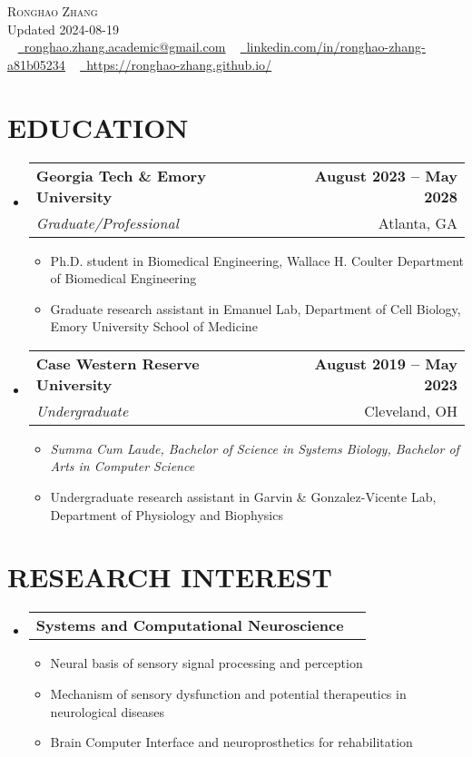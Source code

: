 \documentclass[letterpaper,11pt]{article}
\makeatletter
\newcommand{\resumeItem}[1]{
	\item\small{
		{#1 \vspace{0pt}}
	}
}
\newcommand{\resumeSubheading}[4]{
	\vspace{-2pt}\item
	\begin{tabular*}{1.0\textwidth}[t]{l@{\extracolsep{\fill}}r}
		\textbf{#1} & \textbf{\small #2} \\
		\textit{\small#3} & {\small #4} \\
	\end{tabular*}\vspace{-4pt}
}
\newcommand{\resumeResearchHeading}[2]{
	\vspace{-2pt}\item
	\begin{tabular*}{1.0\textwidth}[t]{l@{\extracolsep{\fill}}r}
		\textbf{#1} & \textbf{\small #2} \\
	\end{tabular*}\vspace{-4pt}
}
\newcommand{\resumeSubHeadingListStart}{\begin{itemize}[leftmargin=0.0in, label={}]}
\newcommand{\resumeSubHeadingListEnd}{\end{itemize}}
\newcommand{\resumeItemListStart}{\begin{itemize}}
\newcommand{\resumeItemListEnd}{\end{itemize}\vspace{-5pt}}
\makeatother
\begin{document}
	
	\begin{center}
		{\Huge \scshape Ronghao Zhang} 
		\\ \vspace{5pt}
		Updated 2024-08-19
		\\ \vspace{5pt}
		\small \raisebox{-0.1\height} ~ 
		\href{mailto:x@gmail.com}{\raisebox{-0.2\height}\faEnvelope\          \underline{ronghao.zhang.academic@gmail.com}} ~ 
		\href{https://linkedin.com/in//}{\raisebox{-0.2\height}\faLinkedin\     \underline{linkedin.com/in/ronghao-zhang-a81b05234}}  ~
		\href{https://ronghao-zhang.github.io/}{\raisebox{-0.2\height}\faGithub\ \underline{https://ronghao-zhang.github.io/}}
		\vspace{1pt}
	\end{center}
	
	\section{EDUCATION}
	\resumeSubHeadingListStart
	\resumeSubheading
	{Georgia Tech \& Emory University}{August 2023 -- May 2028}
	{Graduate/Professional}{Atlanta, GA}
	\resumeItemListStart
	\resumeItem{Ph.D. student in Biomedical Engineering, Wallace H. Coulter Department of Biomedical Engineering}
	\resumeItem{Graduate research assistant in Emanuel Lab, Department of Cell Biology, Emory University School of Medicine}
	\resumeItemListEnd
	\resumeSubheading
	{Case Western Reserve University}{August 2019 -- May 2023}
	{Undergraduate}{Cleveland, OH}
	\resumeItemListStart
	\resumeItem{\it{Summa Cum Laude}, Bachelor of Science in Systems Biology, Bachelor of Arts in Computer Science}
	\resumeItem{Undergraduate research assistant in Garvin \& Gonzalez-Vicente Lab, Department of Physiology and Biophysics}
	\resumeItemListEnd
	\resumeSubHeadingListEnd
	
	\section{RESEARCH INTEREST}
	\resumeSubHeadingListStart
	\resumeResearchHeading{Systems and Computational Neuroscience}{}
	\resumeItemListStart
	\resumeItem{Neural basis of sensory signal processing and perception}
	\resumeItem{Mechanism of sensory dysfunction and potential therapeutics in neurological diseases}
	\resumeItem{Brain Computer Interface and neuroprosthetics for rehabilitation}
	\resumeItemListEnd
	\resumeSubHeadingListEnd      
	
\end{document}

